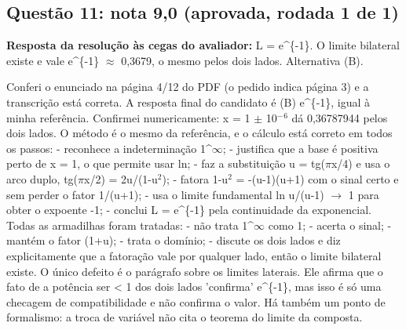 \documentclass{article}%
\begin{document}
\subsection*{Questão 11: nota 9,0 (aprovada, rodada 1 de 1)}%
\textbf{Resposta da resolução às cegas do avaliador:} L = e\^{}\{{-}1\}. O limite bilateral existe e vale e\^{}\{{-}1\} $\approx$ 0,3679, o mesmo pelos dois lados. Alternativa (B).\par %
Conferi o enunciado na página 4/12 do PDF (o pedido indica página 3) e a transcrição está correta. A resposta final do candidato é (B) e\^{}\{{-}1\}, igual à minha referência. Confirmei numericamente: x = 1 $\pm$ 10$^{-}$$^{6}$ dá 0,36787944 pelos dois lados.\newline%
\newline%
O método é o mesmo da referência, e o cálculo está correto em todos os passos:\newline%
{-} reconhece a indeterminação 1\^{}$\infty$;\newline%
{-} justifica que a base é positiva perto de x = 1, o que permite usar ln;\newline%
{-} faz a substituição u = tg($\pi$x/4) e usa o arco duplo, tg($\pi$x/2) = 2u/(1-u$^2$);\newline%
{-} fatora 1-u$^2$ = -(u-1)(u+1) com o sinal certo e sem perder o fator 1/(u+1);\newline%
{-} usa o limite fundamental ln u/(u-1) $\to$ 1 para obter o expoente -1;\newline%
{-} conclui L = e\^{}\{{-}1\} pela continuidade da exponencial.\newline%
\newline%
Todas as armadilhas foram tratadas:\newline%
{-} não trata 1\^{}$\infty$ como 1;\newline%
{-} acerta o sinal;\newline%
{-} mantém o fator (1+u);\newline%
{-} trata o domínio;\newline%
{-} discute os dois lados e diz explicitamente que a fatoração vale por qualquer lado, então o limite bilateral existe.\newline%
\newline%
O único defeito é o parágrafo sobre os limites laterais. Ele afirma que o fato de a potência ser < 1 dos dois lados 'confirma' e\^{}\{{-}1\}, mas isso é só uma checagem de compatibilidade e não confirma o valor. Há também um ponto de formalismo: a troca de variável não cita o teorema do limite da composta.\newline%
$$
\end{document}

